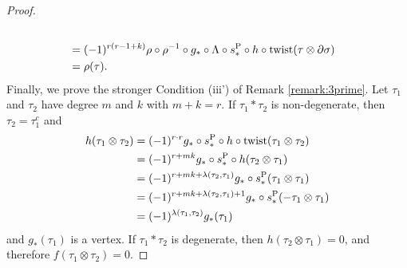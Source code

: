 \begin{proof}
\begin{align*}
	\\
	&= (-1)^{r(r-1+k)}\rho\circ \rho^{-1} \circ g_*\circ \Lambda\circ s_*^{\operatorname{P}}\circ h \circ \mathrm{twist}(\tau\otimes \partial\sigma) 
	\\
	&= \rho(\tau).
	\end{align*}
	Finally, we prove the stronger Condition (iii') of Remark \ref{remark:3prime}. Let $\tau_1$ and $\tau_2$ have degree $m$ and $k$ with $m+k=r$. If $\tau_1*\tau_2$ is non-degenerate, then $\tau_2 = \tau_1^c$ and
	\begin{align*}
		h(\tau_1\otimes \tau_2) 
		&= (-1)^{r\cdot r} g_*\circ s_*^{\operatorname{P}}\circ h\circ \operatorname{twist}(\tau_1\otimes \tau_2)
		\\
		&= (-1)^{r + mk} g_*\circ s_*^{\operatorname{P}}\circ h(\tau_2\otimes \tau_1)
		\\
		&= (-1)^{r + mk + \lambda(\tau_2,\tau_1)} g_*\circ s_*^{\operatorname{P}}(\tau_1\otimes \tau_1)
		\\
		&= (-1)^{r + mk + \lambda(\tau_2,\tau_1) + 1} g_*\circ s_*^{\operatorname{P}}(-\tau_1\otimes \tau_1)
		\\
		&= (-1)^{\lambda(\tau_1,\tau_2)} g_*(\tau_1)
	\end{align*}
	and $g_*(\tau_1)$ is a vertex. If $\tau_1*\tau_2$ is degenerate, then $h(\tau_2\otimes \tau_1) = 0$, and therefore $f(\tau_1\otimes \tau_2)=0$.
	\end{proof}


